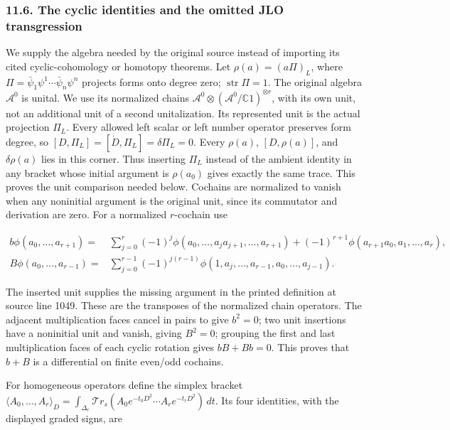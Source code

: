 \documentclass[
  11pt,
]{article}
\begin{document}
\subsubsection{11.6. The cyclic identities and the omitted JLO
transgression}\label{the-cyclic-identities-and-the-omitted-jlo-transgression}

We supply the algebra needed by the original source instead of importing
its cited cyclic-cohomology or homotopy theorems. Let
\(\rho(a)=(a\Pi)_L\), where
\(\Pi=\bar\psi_1\psi^1\cdots\bar\psi_n\psi^n\) projects forms onto
degree zero; \(\operatorname{str}\Pi=1\). The original algebra
\(\mathcal A^0\) is unital. We use its normalized chains
\(\mathcal A^0\otimes(\mathcal A^0/\mathbb C1)^{\otimes r}\), with its
own unit, not an additional unit of a second unitalization. Its
represented unit is the actual projection \(\Pi_L\). Every allowed left
scalar or left number operator preserves form degree, so
\([D,\Pi_L]=[\dot D,\Pi_L]=\delta\Pi_L=0\). Every \(\rho(a)\),
\([D,\rho(a)]\), and \(\delta\rho(a)\) lies in this corner. Thus
inserting \(\Pi_L\) instead of the ambient identity in any bracket whose
initial argument is \(\rho(a_0)\) gives exactly the same trace. This
proves the unit comparison needed below. Cochains are normalized to
vanish when any noninitial argument is the original unit, since its
commutator and derivation are zero. For a normalized \(r\)-cochain use

\[
\begin{split}
 b\phi(a_0,\ldots,a_{r+1})={}&
   \sum_{j=0}^{r}(-1)^j
      \phi(a_0,\ldots,a_ja_{j+1},\ldots,a_{r+1})
   +(-1)^{r+1}\phi(a_{r+1}a_0,a_1,\ldots,a_r),\\
 B\phi(a_0,\ldots,a_{r-1})={}&
   \sum_{j=0}^{r-1}(-1)^{j(r-1)}
        \phi(1,a_j,\ldots,a_{r-1},a_0,\ldots,a_{j-1}).
\end{split}
\tag{IG24}
\]

The inserted unit supplies the missing argument in the printed
definition at source line 1049. These are the transposes of the
normalized chain operators. The adjacent multiplication faces cancel in
pairs to give \(b^2=0\); two unit insertions have a noninitial unit and
vanish, giving \(B^2=0\); grouping the first and last multiplication
faces of each cyclic rotation gives \(bB+Bb=0\). This proves that
\(b+B\) is a differential on finite even/odd cochains.

For homogeneous operators define the simplex bracket
\(\langle A_0,\ldots,A_r\rangle_D=\int_{\Delta_r}\mathcal{T}r_s(A_0e^{-t_0D^2}\cdots A_re^{-t_rD^2})\,dt\).
Its four identities, with the displayed graded signs, are
\end{document}
